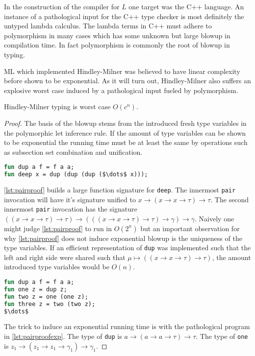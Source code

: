 \documentclass[11pt,oneside,a4paper]{report}
\begin{document}
In the construction of the compiler for $L$ one target was the C++ language.
An instance of a pathological input for the C++ type checker is most definitely the untyped lambda calculus.
The lambda terms in C++ must adhere to polymorphism in many cases which has some unknown but large blowup in compilation time.
In fact polymorphism is commonly the root of blowup in typing.

ML which implemented Hindley-Milner was believed to have linear complexity before shown to be exponential.
As it will turn out, Hindley-Milner also suffers an explosive worst case induced by a pathological input fueled by polymorphism.

\begin{lemma}
    Hindley-Milner typing is worst case $O(c^n)$.
\end{lemma}
\begin{proof}
    The basis of the blowup stems from the introduced fresh type variables in the polymorphic let inference rule.
    If the amount of type variables can be shown to be exponential the running time must be at least the same by operations such as subsection set combination and unification.
\begin{lstlisting}[language=ML,caption={Nested pair},label={lst:pairproof},mathescape=true]
fun dup a f = f a a;
fun deep x = dup (dup (dup ($\dots$ x)));
\end{lstlisting}
    \autoref{lst:pairproof} builds a large function signature for \texttt{deep}.
    The innermost \texttt{pair} invocation will have it's signature unified to $x \rightarrow (x \rightarrow x \rightarrow \tau) \rightarrow \tau$.
    The second innermost \texttt{pair} invocation has the signature $((x \rightarrow x \rightarrow \tau) \rightarrow \tau) \rightarrow (((x \rightarrow x \rightarrow \tau) \rightarrow \tau) \rightarrow \gamma) \rightarrow \gamma$.
    Naively one might judge \autoref{lst:pairproof} to run in $O(2^n)$ but an important observation for why \autoref{lst:pairproof} does not induce exponential blowup is the uniqueness of the type variables.
    If an efficient representation of \texttt{dup} was implemented such that the left and right side were shared such that $\mu \mapsto ((x \rightarrow x \rightarrow \tau) \rightarrow \tau)$, the amount introduced type variables would be $O(n)$.
\begin{lstlisting}[language=ML,caption={Nested pairs with different type variables},label={lst:pairproofexp},mathescape=true]
fun dup a f = f a a;
fun one z = dup z;
fun two z = one (one z);
fun three z = two (two z);
$\dots$
\end{lstlisting}
    The trick to induce an exponential running time is with the pathological program in \autoref{lst:pairproofexp}.
    The type of \texttt{dup} is $a \rightarrow (a \rightarrow a \rightarrow \tau) \rightarrow \tau$.
    The type of \texttt{one} is $z_1 \rightarrow (z_1 \rightarrow z_1 \rightarrow \gamma_1) \rightarrow \gamma_1$.


\end{proof}
\end{document}
